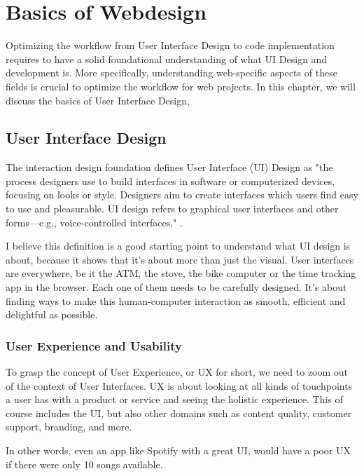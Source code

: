 \section{Basics of Webdesign}
Optimizing the workflow from User Interface Design to code implementation requires to have a solid
foundational understanding of what UI Design and development is. More specifically, understanding
web-specific aspects of these fields is crucial to optimize the workflow for web projects. In this
chapter, we will discuss the basics of User Interface Design,

\subsection{User Interface Design}
The interaction design foundation defines User Interface (UI) Design as "the process designers use
to build interfaces in software or computerized devices, focusing on looks or style. Designers aim
to create interfaces which users find easy to use and pleasurable. UI design refers to graphical
user interfaces and other forms—e.g., voice-controlled interfaces."
.

I believe this definition is a good starting point to understand what UI design is about, because it
shows that it's about more than just the visual. User interfaces are everywhere, be it the ATM, the
stove, the bike computer or the time tracking app in the browser. Each one of them needs to be
carefully designed. It's about finding ways to make this human-computer interaction as smooth,
efficient and delightful as possible.



\subsubsection{User Experience and Usability}
To grasp the concept of User Experience, or UX for short, we need to zoom out of the context of User
Interfaces. UX is about looking at all kinds of touchpoints a user has with a product or service and
seeing the holistic experience. This of course includes the UI, but also other domains such as
content quality, customer support, branding, and more. 

In other words, even an app like Spotify with a great UI, would have a poor UX if there were only 10
songs available.

